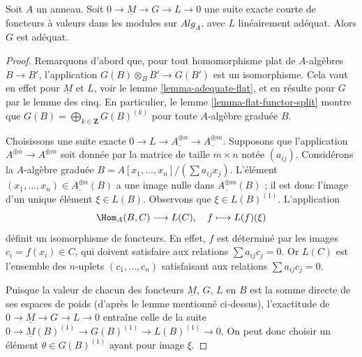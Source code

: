 \begin{lemma}
\label{lemma-extension-adequate-key}
Soit $A$ un anneau.
Soit $0 \to \underline{M} \to G \to L \to 0$ une suite exacte courte
de foncteurs à valeurs dans les modules sur $\textit{Alg}_A$, avec $L$ linéairement adéquat.
Alors $G$ est adéquat.
\end{lemma}

\begin{proof}
Remarquons d'abord que, pour tout homomorphisme plat de $A$-algèbres
$B \to B'$, l'application $G(B) \otimes_B B' \to G(B')$ est un isomorphisme.
Cela vaut en effet pour $\underline{M}$ et $L$, voir le
lemme \ref{lemma-adequate-flat},
et en résulte pour $G$ par le lemme des cinq. En particulier, le
lemme \ref{lemma-flat-functor-split}
montre que $G(B) = \bigoplus_{k \in \mathbf{Z}} G(B)^{(k)}$
pour toute $A$-algèbre graduée $B$.

\medskip\noindent
Choisissons une suite exacte
$0 \to L \to \underline{A^{\oplus n}} \to \underline{A^{\oplus m}}$.
Supposons que l'application $A^{\oplus n} \to A^{\oplus m}$ soit donnée par la
matrice de taille $m \times n$ notée $(a_{ij})$. Considérons la $A$-algèbre graduée
$B = A[x_1, \ldots, x_n]/(\sum a_{ij}x_j)$. L'élément
$(x_1, \ldots, x_n) \in \underline{A^{\oplus n}}(B)$ a une image nulle dans
$\underline{A^{\oplus m}}(B)$ ; il est donc l'image d'un unique élément
$\xi \in L(B)$. Observons que $\xi \in L(B)^{(1)}$. L'application
$$
\Hom_A(B, C) \longrightarrow L(C), \quad
f \longmapsto L(f)(\xi)
$$
définit un isomorphisme de foncteurs. En effet, $f$ est
déterminé par les images $c_i = f(x_i) \in C$, qui doivent
satisfaire aux relations $\sum a_{ij}c_j = 0$. Or $L(C)$ est
l'ensemble des $n$-uplets $(c_1, \ldots, c_n)$ satisfaisant aux relations
$\sum a_{ij} c_j = 0$.

\medskip\noindent
Puisque la valeur de chacun des foncteurs $\underline{M}$, $G$, $L$
en $B$ est la somme directe de ses espaces de poids (d'après le lemme
mentionné ci-dessus), l'exactitude de $0 \to \underline{M} \to G \to L \to 0$ entraîne
celle de la suite $0 \to \underline{M}(B)^{(1)} \to G(B)^{(1)} \to L(B)^{(1)} \to 0$.
On peut donc choisir un élément $\theta \in G(B)^{(1)}$ ayant pour image
$\xi$.


\end{proof}
